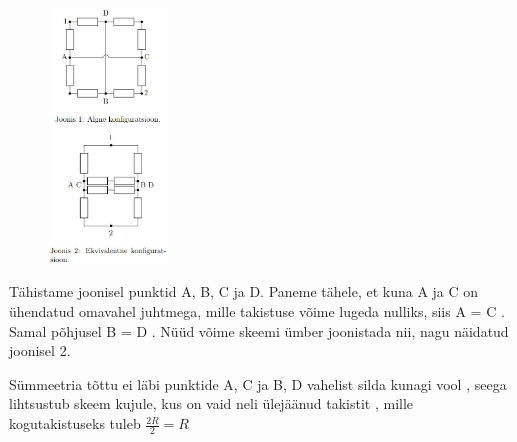 \solu
\begin{figure}
    \vspace{-30pt}
	\includegraphics[width=0.28\textwidth]{2020-v2g-04-sol.jpg}
	\vspace{-40pt}
\end{figure}
Tähistame joonisel punktid A, B, C
ja D. Paneme tähele, et kuna
A ja C on ühendatud omavahel
juhtmega, mille takistuse võime
lugeda nulliks, siis A = C . Samal
põhjusel B = D . Nüüd võime
skeemi ümber joonistada nii, nagu
näidatud joonisel 2. 

Sümmeetria tõttu ei läbi punktide A, C ja B, D vahelist silda kunagi vool , seega lihtsustub skeem
kujule, kus on vaid neli ülejäänud takistit , mille kogutakistuseks tuleb $\frac{2R}{2} = R$ 
\probend